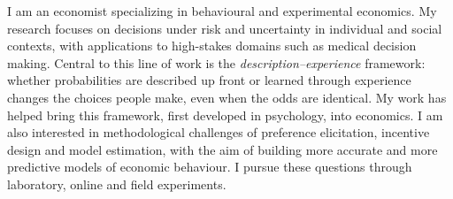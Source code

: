 
\begin{justify}
I am an economist specializing in behavioural and experimental economics. 
My research focuses on decisions under risk and uncertainty in
individual and social contexts, with applications to high-stakes
domains such as medical decision making. Central to this line of
work is the \textit{description--experience} framework: whether
probabilities are described up front or learned through experience
changes the choices people make, even when the odds are identical.
My work has helped bring this framework, first developed in
psychology, into economics. I am also interested in methodological
challenges of preference elicitation, incentive design and model
estimation, with the aim of building more accurate and more
predictive models of economic behaviour. I pursue these questions
through laboratory, online and field experiments.
\end{justify}

\vspace{\rubricafterspace}